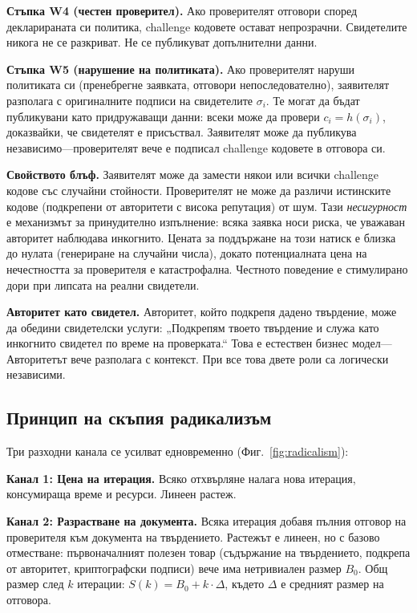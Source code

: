 \documentclass[11pt,a4paper,twocolumn]{article}
\begin{document}
\textbf{Стъпка W4 (честен проверител).} Ако проверителят отговори според декларираната си политика, challenge кодовете остават непрозрачни. Свидетелите никога не се разкриват. Не се публикуват допълнителни данни.

\textbf{Стъпка W5 (нарушение на политиката).} Ако проверителят наруши политиката си (пренебрегне заявката, отговори непоследователно), заявителят разполага с оригиналните подписи на свидетелите $\sigma_i$. Те могат да бъдат публикувани като придружаващи данни: всеки може да провери $c_i = h(\sigma_i)$, доказвайки, че свидетелят е присъствал. Заявителят може да публикува независимо---проверителят вече е подписал challenge кодовете в отговора си.

\textbf{Свойството блъф.} Заявителят може да замести някои или всички challenge кодове със случайни стойности. Проверителят не може да различи истинските кодове (подкрепени от авторитети с висока репутация) от шум. Тази \emph{несигурност} е механизмът за принудително изпълнение: всяка заявка носи риска, че уважаван авторитет наблюдава инкогнито. Цената за поддържане на този натиск е близка до нулата (генериране на случайни числа), докато потенциалната цена на нечестността за проверителя е катастрофална. Честното поведение е стимулирано дори при липсата на реални свидетели.

\textbf{Авторитет като свидетел.} Авторитет, който подкрепя дадено твърдение, може да обедини свидетелски услуги: „Подкрепям твоето твърдение и служа като инкогнито свидетел по време на проверката.“ Това е естествен бизнес модел---Авторитетът вече разполага с контекст. При все това двете роли са логически независими.

\subsection{Принцип на скъпия радикализъм}

Три разходни канала се усилват едновременно (Фиг.~\ref{fig:radicalism}):

\textbf{Канал 1: Цена на итерация.} Всяко отхвърляне налага нова итерация, консумираща време и ресурси. Линеен растеж.

\textbf{Канал 2: Разрастване на документа.} Всяка итерация добавя пълния отговор на проверителя към документа на твърдението. Растежът е линеен, но с базово отместване: първоначалният полезен товар (съдържание на твърдението, подкрепа от авторитет, криптографски подписи) вече има нетривиален размер $B_0$. Общ размер след $k$ итерации: $S(k) = B_0 + k \cdot \Delta$, където $\Delta$ е средният размер на отговора.
\end{document}
